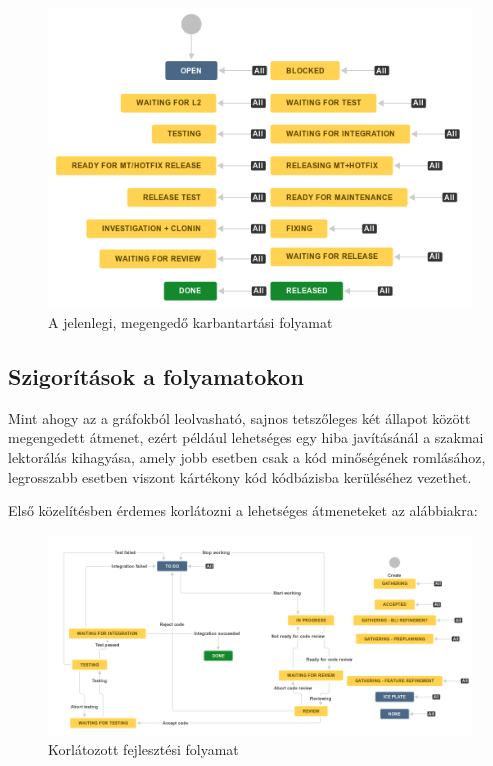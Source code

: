 \begin{figure}[h]
    \includegraphics[width=\textwidth, height=0.4\textheight, keepaspectratio]{figures/oldmt.png}
    \centering
    \caption{A jelenlegi, megengedő karbantartási folyamat}
    \label{fig:oldmt}
\end{figure}

\FloatBarrier
\pagebreak[3]
\subsection{Szigorítások a folyamatokon}

Mint ahogy az a gráfokból leolvasható, sajnos tetszőleges két állapot között megengedett átmenet,
ezért például lehetséges egy hiba javításánál a szakmai lektorálás kihagyása, amely jobb esetben
csak a kód minőségének romlásához, legrosszabb esetben viszont kártékony kód kódbázisba kerüléséhez
vezethet.

Első közelítésben érdemes korlátozni a lehetséges átmeneteket az alábbiakra:

\begin{figure}[h]
    \includegraphics[width=\textwidth, keepaspectratio]{figures/newfeature.png}
    \centering
    \caption{Korlátozott fejlesztési folyamat}
    \label{fig:newfeature}
\end{figure}

